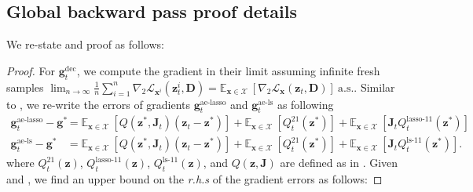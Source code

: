 \documentclass[10pt]{article} %
\newcommand{\E}{\mathbb{E}} %
\newcommand{\D}{{\bm D}}
\newcommand{\J}{{\bm J}}
\newcommand{\x}{{\bm x}}
\newcommand{\z}{{\bm z}}
\newcommand{\g}{{\bm g}}
\newcommand{\Loss}{\mathcal{L}}
\newcommand{\X}{\mathcal{X}}
\begin{document}
\subsection{Global backward pass proof details}
%
%
We re-state and proof  as follows:
%
\globalgrad*
%
\begin{proof}
For $\g_t^{\text{dec}}$, we compute the gradient in their limit assuming infinite fresh samples $\lim_{n \to \infty} \frac{1}{n} \sum_{i=1}^n \nabla_2 \Loss_{\x^i}(\z_t^{i}, \D)= \E_{\x \in \X}\ [\nabla_2 \Loss_{\x}(\z_t, \D)] \ \text{a.s.}$. Similar to , we re-write the errors of gradients $\g_t^{\text{ae-lasso}}$ and $\g_t^{\text{ae-ls}}$ as following
%
\begin{equation}
\begin{aligned}
\g_t^{\text{ae-lasso}} - \g^{\ast}  &= \E_{\x \in \X}\ [Q(\z^{\ast}, \J_t) (\z_t - \z^{\ast})] + \E_{\x \in \X}\ [Q_t^{21}(\z^{\ast})] + \E_{\x \in \X}\ [\J_t Q_t^{\text{lasso-}11}(\z^{\ast})]\\
\g_t^{\text{ae-ls}} - \g^{\ast}  &= \E_{\x \in \X}\ [Q(\z^{\ast}, \J_t) (\z_t - \z^{\ast})] + \E_{\x \in \X}\ [Q_t^{21}(\z^{\ast})] + \E_{\x \in \X}\ [\J_t Q_t^{\text{ls-}11}(\z^{\ast})].
\end{aligned}
\end{equation}
where $Q_t^{21}(\z)$, $Q_t^{\text{lasso-}11}(\z)$, $Q_t^{\text{ls-}11}(\z)$, and $Q(\z, \J)$ are defined as in . Given  and , we find an upper bound on the {\it r.h.s} of the gradient errors as follows:


\end{proof}
\end{document}
